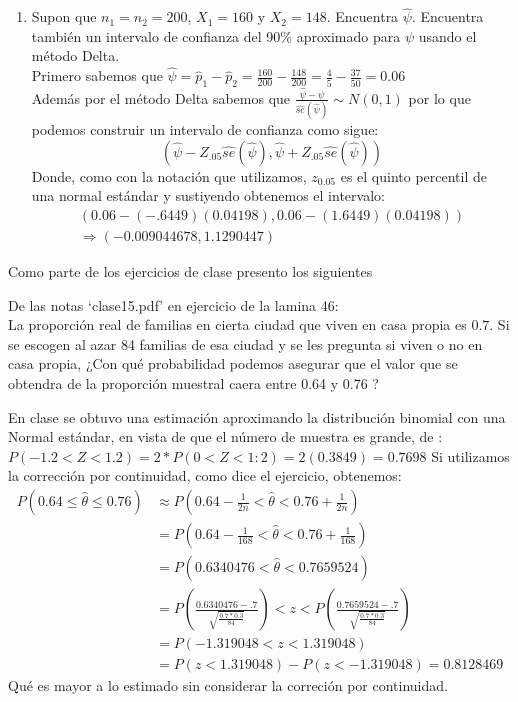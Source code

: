 \documentclass[letter]{memoir} %
\newenvironment{cframe}[1][blue]
  {\begin{tcolorbox}[colframe=#1,colback=white]}
  {\end{tcolorbox}}
\begin{document}
\begin{enumerate}
\begin{enumerate}
\[    \]
Con lo que obtenemos $\hat{se}(\hat{\psi}) = \sqrt{ \frac{\hat{p}_1(1-\hat{p}_1)}{n_1}      + \frac{\hat{p}_2(1-\hat{p}_2)}{n_2}}$
\[\]
\item
 Supon que $n_1 = n_2 = 200$, $X_1 = 160$ y $X_2 = 148$. Encuentra
$\hat{\psi}$. Encuentra también un intervalo de confianza del 90\% aproximado para $\psi$ usando el método Delta. 
\[\]
 Primero sabemos que $\hat{\psi} = \hat{p}_1-\hat{p}_2 = \frac{160}{200}-\frac{148}{200}=\frac{4}{5}-\frac{37}{50}=0.06$\\
 Además por el método Delta sabemos que $\frac{\hat{\psi}- \psi}{\hat{se}( \hat{\psi} )} \sim N(0,1)$ por lo que podemos construir un intervalo de confianza como sigue:
 \[ (\hat{\psi}- Z_{.05}\hat{se}( \hat{\psi} ), \hat{\psi}+ Z_{.05}\hat{se}( \hat{\psi} ) )\]
Donde, como con la notación que utilizamos, $z_{0.05}$ es el quinto percentil de una normal estándar y sustiyendo obtenemos el intervalo:
 \[ 
\begin{split}
\left(0.06- (-.6449) (0.04198), 0.06-(1.6449)(0.04198) \right)  \\
\Rightarrow \left( -0.009044678 , 1.1290447  \right)
\end{split} 
 \]
\end{enumerate}

\begin{cframe}[teal]
Como parte de los ejercicios de clase presento los siguientes
\end{cframe}

\begin{cframe}[violet]
\item De las notas ‘clase15.pdf’ en ejercicio de la lamina 46: \\
La proporción real de familias en cierta ciudad que viven en casa
propia es $0.7$. Si se escogen al azar 84 familias de esa ciudad y se les pregunta si viven o no en casa propia, ¿Con qué probabilidad podemos asegurar que el valor que se obtendra de la proporción muestral caera entre 0.64 y 0.76 ?
\end{cframe}
En clase se obtuvo una estimación aproximando la distribución binomial con una Normal estándar, en vista de que el número de muestra es grande, de :\\
$P(-1.2 < Z < 1.2) = 2*P(0 < Z < 1:2) = 2(0.3849) = 0.7698$
Si utilizamos la corrección por continuidad, como dice el ejercicio, obtenemos:
\[
\begin{split}
P(0.64 \leq \hat{\theta} \leq 0.76) & \approx P(0.64-\frac{1}{2n} < \hat{\theta} < 0.76+\frac{1}{2n} ) \\
& =P(0.64-\frac{1}{168} < \hat{\theta} < 0.76 + \frac{1}{168} )\\
& =P(0.6340476 < \hat{\theta} < 0.7659524) \\
& = P(\frac{0.6340476 - .7}{\sqrt{\frac{0.7*0.3}{84}}}) < z <P(\frac{0.7659524 - .7}{\sqrt{\frac{0.7*0.3}{84}}})  \\
& = P(-1.319048 < z <1.319048)   \\
& = P( z <1.319048) - P(z<-1.319048) =  0.8128469
\end{split}
\]
Qué es mayor a lo estimado sin considerar la correción por continuidad.


\end{enumerate}
\end{document}
